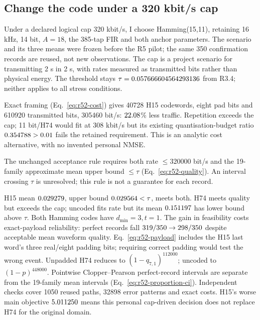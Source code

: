 \subsection{Change the code under a 320 kbit/s cap}
\label{sec:r52}
Under a declared logical cap 320 kbit/s, I choose Hamming(15,11),
retaining 16 kHz, 14 bit, $ A=18 $, the 385-tap FIR and both anchor parameters.
The scenario and its three means were frozen before the R5 pilot;
the same 350 confirmation records are reused, not new observations.
The cap is a project scenario for transmitting 2 s in 2 s, with rates measured as transmitted bits rather than physical energy. The threshold stays
$\tau=0.057666604564293136 $ from R3.4; neither applies to all stress conditions.

\begin{table}[htbp]
 \centering\small
 \caption{Exact 2 s costs under the new personal 320 kbit/s cap. Q fit retains the R3 quantisation budget; 11 bit is an analytic cost alternative, without new waveform measurements.}
 \label{tab:r52-cost}
 
 
 
\end{table}

Exact framing (Eq.~\eqref{eq:r52-cost}) gives 40728 H15 codewords,
eight pad bits and 610920 transmitted bits, 305460 bit/s:
$22.08 $\% less traffic. Repetition exceeds the cap;
11 bit/H74 would fit at 308 kbit/s but its existing quantisation-budget
ratio $0.354788>0.01 $ fails the retained requirement.
This is an analytic cost alternative, with no invented personal NMSE.

The unchanged acceptance rule requires both rate $\le320000 $ bit/s and
the 19-family approximate mean upper bound $\le\tau $
(Eq.~\eqref{eq:r52-quality}). An interval crossing $\tau $ is unresolved;
this rule is not a guarantee for each record.

\begin{table}[H]
 \centering\small
 \caption{Same 350 new R5 records at the anchor point. Intervals use the 19-statistic family; perfect payloads require all real information bits, excluding padding.}
 \label{tab:r52-quality}
 
 
 
\end{table}

H15 mean $0.029279 $, upper bound $0.029564<\tau $, meets both.
H74 meets quality but exceeds the cap; uncoded fits rate but its mean
$0.151197 $ has lower bound above $\tau $. Both Hamming codes have
$ d_{\min}=3,t=1 $.
The gain in feasibility costs exact-payload reliability: perfect records
fall $319/350\to298/350 $ despite acceptable
mean waveform quality. Eq.~\eqref{eq:r52-payload} includes the H15 last
word's three real/eight padding bits; requiring correct padding would
test the wrong event. Unpadded H74 reduces to $(1-q_{7,1})^{112000}$;
uncoded to $(1-p)^{448000}$.
Pointwise Clopper--Pearson perfect-record intervals are separate from
the 19-family mean intervals (Eq.~\eqref{eq:r52-proportion-ci}).
Independent checks cover 1050 reused paths, 32898 error patterns and
exact costs. H15's worse main objective $5.011250 $ means this
personal cap-driven decision does not replace H74 for the original domain.
